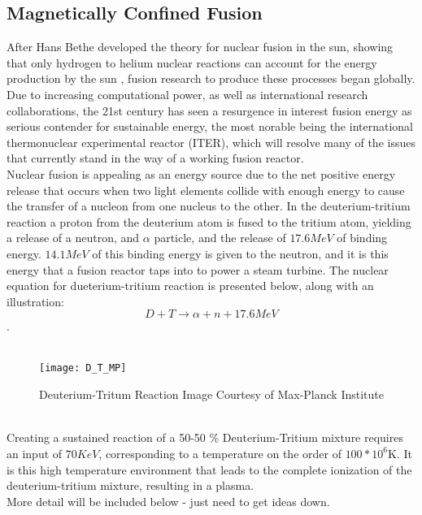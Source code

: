 \documentclass{article}
\begin{document}
\subsection{Magnetically Confined Fusion}
After Hans Bethe developed the theory for nuclear fusion in the sun, showing that only hydrogen to helium nuclear reactions can account for the energy production by the sun  \cite{Bethe}, fusion research to produce these processes began globally. Due to increasing computational power, as well as international  research collaborations, the 21st century has seen a resurgence in interest fusion energy as serious contender for sustainable energy, the most norable being the international thermonuclear experimental reactor (ITER), which will resolve many of the issues that currently stand in the way of a working fusion reactor.\\
Nuclear fusion is appealing as an energy source due to the net positive energy release that occurs when two light elements collide with enough energy to cause the transfer of a nucleon from one nucleus to the other. In the deuterium-tritium reaction a proton from the deuterium atom is fused to the tritium atom, yielding a release of a neutron, and $\alpha$ particle, and the release of $17.6 MeV$ of binding energy. $14.1 MeV$ of this binding energy is given to the neutron, and it is this energy that a fusion reactor taps into to power a steam turbine. The nuclear equation for dueterium-tritium reaction is presented below, along with an illustration:
$$
D+T \rightarrow \alpha + n + 17.6 MeV
$$
 \cite{J_Friedberg:1} .\\
\\
\begin{figure}[h]
	\centering
	\texttt{[image: D\_T\_MP]}
	\caption{Deuterium-Tritum Reaction Image Courtesy of Max-Planck Institute}
\end{figure}
\\
Creating a sustained reaction of a 50-50 $\%$ Deuterium-Tritium mixture requires an input of $70KeV$, corresponding to a temperature on the order of $100*10^6$K. It is this high temperature environment that leads to the complete ionization of the deuterium-tritium mixture, resulting in a plasma.\\
More detail will be included below - just need to get ideas down.\\
\end{document}
